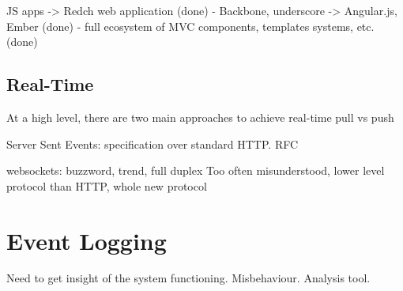 	JS apps -> Redch web application (done)
	- Backbone, underscore -> Angular.js, Ember (done)
	- full ecosystem of MVC components, templates systems, etc. (done)


\subsection{Real-Time}
At a high level, there are two main approaches to achieve real-time pull vs push

Server Sent Events:
specification over standard HTTP. RFC

websockets:
buzzword, trend, full duplex
Too often misunderstood, lower level protocol than HTTP, whole new protocol

\section{Event Logging}
Need to get insight of the system functioning. Misbehaviour. Analysis tool.
